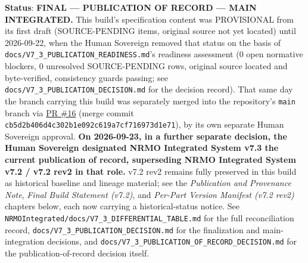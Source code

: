 {\textbf{Status}: \textbf{FINAL --- PUBLICATION OF RECORD --- MAIN
INTEGRATED.} This build's specification content was PROVISIONAL from
its first draft (SOURCE-PENDING items, original source not yet
located) until 2026-09-22, when the Human Sovereign removed that
status on the basis of
\texttt{docs/V7\_3\_PUBLICATION\_READINESS.md}'s readiness assessment
(0 open normative blockers, 0 unresolved SOURCE-PENDING rows, original
source located and byte-verified, consistency guards passing; see
\texttt{docs/V7\_3\_PUBLICATION\_DECISION.md} for the decision record).
That same day the branch carrying this build was separately merged
into the repository's \texttt{main} branch via
\href{https://github.com/zarame96/NRMO/pull/16}{PR \#16} (merge commit
\texttt{cb5d2b406d4c302b1e092c619a7cf716973d1e71}), by its own separate
Human Sovereign approval. \textbf{On 2026-09-23, in a further separate
decision, the Human Sovereign designated NRMO Integrated System v7.3
the current publication of record, superseding NRMO Integrated System
v7.2 / v7.2 rev2 in that role.} v7.2 rev2 remains fully preserved in
this build as historical baseline and lineage material; see the
\emph{Publication and Provenance Note}, \emph{Final Build Statement
(v7.2)}, and \emph{Per-Part Version Manifest (v7.2 rev2)} chapters
below, each now carrying a historical-status notice. See
\texttt{NRMOIntegrated/docs/V7\_3\_DIFFERENTIAL\_TABLE.md} for the full
reconciliation record, \texttt{docs/V7\_3\_PUBLICATION\_DECISION.md}
for the finalization and main-integration decisions, and
\texttt{docs/V7\_3\_PUBLICATION\_OF\_RECORD\_DECISION.md} for the
publication-of-record decision itself.
}
